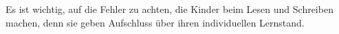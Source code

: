 Es ist wichtig, auf die Fehler zu achten, die Kinder beim Lesen und Schreiben machen, denn sie geben Aufschluss über ihren individuellen Lernstand.